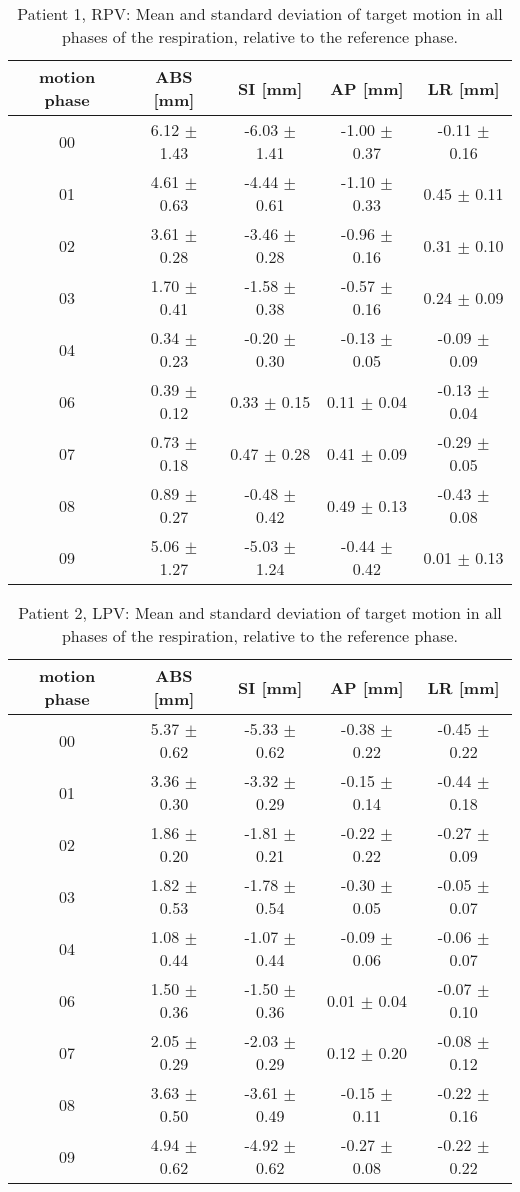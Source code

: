 \begin{table}[H]
  \centering
  \caption{Patient 1, RPV: Mean and standard deviation of target motion in all phases of the respiration, relative to the reference phase.}
  \begin{tabular}{|c|c|c|c|c|}
    \hline\hline
    motion phase & ABS [mm] & SI [mm] & AP [mm] & LR [mm]\\
    \hline 
00& 6.12 $\pm$ 1.43& -6.03 $\pm$ 1.41& -1.00 $\pm$ 0.37& -0.11 $\pm$ 0.16 \\
01& 4.61 $\pm$ 0.63& -4.44 $\pm$ 0.61& -1.10 $\pm$ 0.33& 0.45 $\pm$ 0.11 \\
02& 3.61 $\pm$ 0.28& -3.46 $\pm$ 0.28& -0.96 $\pm$ 0.16& 0.31 $\pm$ 0.10 \\
03& 1.70 $\pm$ 0.41& -1.58 $\pm$ 0.38& -0.57 $\pm$ 0.16& 0.24 $\pm$ 0.09 \\
04& 0.34 $\pm$ 0.23& -0.20 $\pm$ 0.30& -0.13 $\pm$ 0.05& -0.09 $\pm$ 0.09 \\
06& 0.39 $\pm$ 0.12& 0.33 $\pm$ 0.15& 0.11 $\pm$ 0.04& -0.13 $\pm$ 0.04 \\
07& 0.73 $\pm$ 0.18& 0.47 $\pm$ 0.28& 0.41 $\pm$ 0.09& -0.29 $\pm$ 0.05 \\
08& 0.89 $\pm$ 0.27& -0.48 $\pm$ 0.42& 0.49 $\pm$ 0.13& -0.43 $\pm$ 0.08 \\
09& 5.06 $\pm$ 1.27& -5.03 $\pm$ 1.24& -0.44 $\pm$ 0.42& 0.01 $\pm$ 0.13 \\
        \hline\hline
  \end{tabular}
\end{table}

\newpage

\begin{table}[H]
  \centering
  \caption{Patient 2, LPV: Mean and standard deviation of target motion in all phases of the respiration, relative to the reference phase.}
  \begin{tabular}{|c|c|c|c|c|}
    \hline\hline
    motion phase & ABS [mm] & SI [mm] & AP [mm] & LR [mm]\\
    \hline 
00& 5.37 $\pm$ 0.62& -5.33 $\pm$ 0.62& -0.38 $\pm$ 0.22& -0.45 $\pm$ 0.22 \\
01& 3.36 $\pm$ 0.30& -3.32 $\pm$ 0.29& -0.15 $\pm$ 0.14& -0.44 $\pm$ 0.18 \\
02& 1.86 $\pm$ 0.20& -1.81 $\pm$ 0.21& -0.22 $\pm$ 0.22& -0.27 $\pm$ 0.09 \\
03& 1.82 $\pm$ 0.53& -1.78 $\pm$ 0.54& -0.30 $\pm$ 0.05& -0.05 $\pm$ 0.07 \\
04& 1.08 $\pm$ 0.44& -1.07 $\pm$ 0.44& -0.09 $\pm$ 0.06& -0.06 $\pm$ 0.07 \\
06& 1.50 $\pm$ 0.36& -1.50 $\pm$ 0.36& 0.01 $\pm$ 0.04& -0.07 $\pm$ 0.10 \\
07& 2.05 $\pm$ 0.29& -2.03 $\pm$ 0.29& 0.12 $\pm$ 0.20& -0.08 $\pm$ 0.12 \\
08& 3.63 $\pm$ 0.50& -3.61 $\pm$ 0.49& -0.15 $\pm$ 0.11& -0.22 $\pm$ 0.16 \\
09& 4.94 $\pm$ 0.62& -4.92 $\pm$ 0.62& -0.27 $\pm$ 0.08& -0.22 $\pm$ 0.22 \\
        \hline\hline
  \end{tabular}
\end{table}

